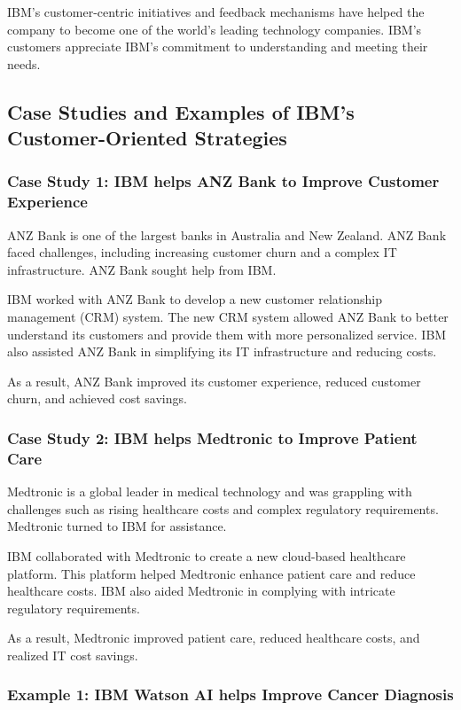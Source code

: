 IBM's customer-centric initiatives and feedback mechanisms have helped the company to become one of the world's leading technology companies. IBM's customers appreciate IBM's commitment to understanding and meeting their needs.

\subsection{Case Studies and Examples of IBM's Customer-Oriented Strategies}

\subsubsection{Case Study 1: IBM helps ANZ Bank to Improve Customer Experience}

ANZ Bank is one of the largest banks in Australia and New Zealand. ANZ Bank faced challenges, including increasing customer churn and a complex IT infrastructure. ANZ Bank sought help from IBM.

IBM worked with ANZ Bank to develop a new customer relationship management (CRM) system. The new CRM system allowed ANZ Bank to better understand its customers and provide them with more personalized service. IBM also assisted ANZ Bank in simplifying its IT infrastructure and reducing costs.

As a result, ANZ Bank improved its customer experience, reduced customer churn, and achieved cost savings.

\subsubsection{Case Study 2: IBM helps Medtronic to Improve Patient Care}

Medtronic is a global leader in medical technology and was grappling with challenges such as rising healthcare costs and complex regulatory requirements. Medtronic turned to IBM for assistance.

IBM collaborated with Medtronic to create a new cloud-based healthcare platform. This platform helped Medtronic enhance patient care and reduce healthcare costs. IBM also aided Medtronic in complying with intricate regulatory requirements.

As a result, Medtronic improved patient care, reduced healthcare costs, and realized IT cost savings.

\subsubsection{Example 1: IBM Watson AI helps Improve Cancer Diagnosis}

